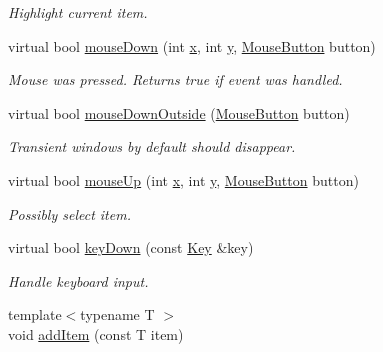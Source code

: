 \begin{DoxyCompactItemize}
\begin{DoxyCompactList}\small\item\em Highlight current item. \end{DoxyCompactList}\item 
\hypertarget{classGUI_1_1Menu_a8a8b70584666a921cdb7f8b73bc281c4}{virtual bool \hyperlink{classGUI_1_1Menu_a8a8b70584666a921cdb7f8b73bc281c4}{mouse\-Down} (int \hyperlink{classGUI_1_1Window_a6ca6a80ca00c9e1d8ceea8d3d99a657d}{x}, int \hyperlink{classGUI_1_1Window_a0ee8e923aff2c3661fc2e17656d37adf}{y}, \hyperlink{namespaceGUI_ad06082a7b02aa73697f39eb8e0856de9}{Mouse\-Button} button)}\label{classGUI_1_1Menu_a8a8b70584666a921cdb7f8b73bc281c4}

\begin{DoxyCompactList}\small\item\em Mouse was pressed. Returns true if event was handled. \end{DoxyCompactList}\item 
virtual bool \hyperlink{classGUI_1_1Menu_afccc45f348b1ff9cd2668f8e29731589}{mouse\-Down\-Outside} (\hyperlink{namespaceGUI_ad06082a7b02aa73697f39eb8e0856de9}{Mouse\-Button} button)
\begin{DoxyCompactList}\small\item\em Transient windows by default should disappear. \end{DoxyCompactList}\item 
\hypertarget{classGUI_1_1Menu_a4bb3124249e2092d1f8ec90ae698a66f}{virtual bool \hyperlink{classGUI_1_1Menu_a4bb3124249e2092d1f8ec90ae698a66f}{mouse\-Up} (int \hyperlink{classGUI_1_1Window_a6ca6a80ca00c9e1d8ceea8d3d99a657d}{x}, int \hyperlink{classGUI_1_1Window_a0ee8e923aff2c3661fc2e17656d37adf}{y}, \hyperlink{namespaceGUI_ad06082a7b02aa73697f39eb8e0856de9}{Mouse\-Button} button)}\label{classGUI_1_1Menu_a4bb3124249e2092d1f8ec90ae698a66f}

\begin{DoxyCompactList}\small\item\em Possibly select item. \end{DoxyCompactList}\item 
\hypertarget{classGUI_1_1Menu_aa9e05f820c1edeb1c884e75bd71b2b6b}{virtual bool \hyperlink{classGUI_1_1Menu_aa9e05f820c1edeb1c884e75bd71b2b6b}{key\-Down} (const \hyperlink{classGUI_1_1Key}{Key} \&key)}\label{classGUI_1_1Menu_aa9e05f820c1edeb1c884e75bd71b2b6b}

\begin{DoxyCompactList}\small\item\em Handle keyboard input. \end{DoxyCompactList}\item 
\hypertarget{classGUI_1_1Menu_af1f513668dcbc8e912c65e2fd7e03b24}{{\footnotesize template$<$typename T $>$ }\\void \hyperlink{classGUI_1_1Menu_af1f513668dcbc8e912c65e2fd7e03b24}{add\-Item} (const T item)}\label{classGUI_1_1Menu_af1f513668dcbc8e912c65e2fd7e03b24}


\end{DoxyCompactItemize}
